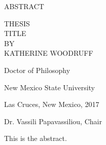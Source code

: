 \begin{center}
ABSTRACT
\end{center}
\vspace{0.3in}
\begin{center}
THESIS\\ TITLE
\\
BY
\\
KATHERINE WOODRUFF
\end{center}
\vspace{0.3in}
\begin{center}
Doctor of Philosophy

New Mexico State University

Las Cruces, New Mexico, 2017

Dr. Vassili Papavassiliou, Chair
\end{center}
\vspace{0.3in}
\hspace{\parindent}
This is the abstract.

\newpage
